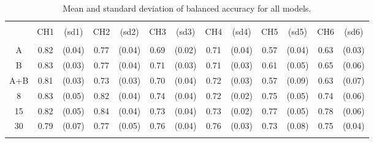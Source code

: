\begin{table}[!htbp] \centering 
\begin{tabular}{@{\extracolsep{-5pt}} ccccccccccccc} 
\\[-1.8ex]\hline 
\hline \\[-1.8ex] 
 & CH1 & (sd1) & CH2 & (sd2) & CH3 & (sd3) & CH4 & (sd4) & CH5 & (sd5) & CH6 & (sd6) \\ 
\hline \\[-1.8ex] 
A & 0.82 & (0.04) & 0.77 & (0.04) & 0.69 & (0.02) & 0.71 & (0.04) & 0.57 & (0.04) & 0.63 & (0.03) \\ 
B & 0.83 & (0.03) & 0.77 & (0.04) & 0.71 & (0.03) & 0.71 & (0.03) & 0.61 & (0.05) & 0.65 & (0.06) \\ 
A+B & 0.81 & (0.03) & 0.73 & (0.03) & 0.70 & (0.04) & 0.72 & (0.03) & 0.57 & (0.09) & 0.63 & (0.07) \\ 
8 & 0.83 & (0.05) & 0.82 & (0.04) & 0.74 & (0.04) & 0.72 & (0.02) & 0.75 & (0.05) & 0.74 & (0.06) \\ 
15 & 0.82 & (0.05) & 0.84 & (0.04) & 0.73 & (0.04) & 0.73 & (0.02) & 0.77 & (0.05) & 0.78 & (0.06) \\ 
30 & 0.79 & (0.07) & 0.77 & (0.05) & 0.76 & (0.04) & 0.76 & (0.03) & 0.73 & (0.08) & 0.75 & (0.04) \\ 
\hline \\[-1.8ex] 
\end{tabular} 
  \caption{Mean and standard deviation of balanced accuracy for all models.} 
  \label{tab:all-accuracy} 
\end{table} 
